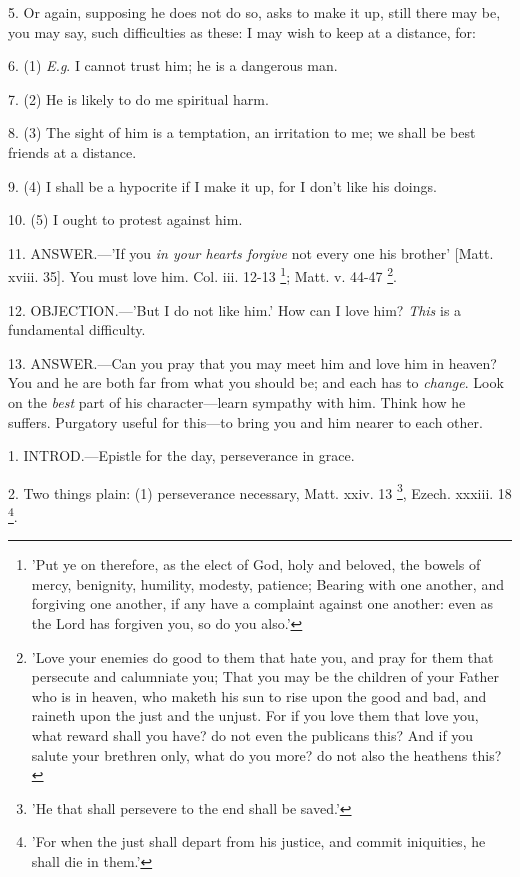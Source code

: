 5. Or again, supposing he does not do so, asks to
make it up, still there may be, you may say, such difficulties as
these: I may wish to keep at a distance, for:

6. (1) \emph{E.g}. I cannot trust him; he is a
dangerous man.

7. (2) He is likely to do me spiritual harm.

8. (3) The sight of him is a temptation, an
irritation to me; we shall be best friends at a distance.

9. (4) I shall be a hypocrite if I make it up,
for I don't like his doings.

10. (5) I ought to protest against him.

11. ANSWER.—'If
you \emph{in your hearts forgive} not every one his brother'
[Matt. xviii. 35]. You must love him. Col. iii. 12-13 \footnote{'Put ye on therefore, as
the elect of God, holy and beloved, the bowels of mercy, benignity,
humility, modesty, patience; Bearing with one another, and forgiving
one another, if any have a complaint against one another: even as the
Lord has forgiven you, so do you also.'}; Matt. v. 44-47 \footnote{'Love your enemies do
good to them that hate you, and pray for them that persecute and
calumniate you; That you may be the children of your Father who is in
heaven, who maketh his sun to rise upon the good and bad, and raineth
upon the just and the unjust. For if you love them that love you, what
reward shall you have? do not even the publicans this? And if you
salute your brethren only, what do you more? do not also the heathens
this?}.

12. OBJECTION.—'But
I do not like him.' How can I love him? \emph{This} is a fundamental
difficulty.

13. ANSWER.—Can
you pray that you may meet him and love him in heaven? You and he are
both far from what you should be; and each has to \emph{change}. Look
on the \emph{best} part of his character—learn sympathy with him.
Think how he suffers. Purgatory useful for this—to bring you and him
nearer to each other.


1. INTROD.—Epistle
for the day, perseverance in grace.

2. Two things plain: (1) perseverance necessary,
Matt. xxiv. 13 \footnote{'He that shall persevere
to the end shall be saved.'}, Ezech.
xxxiii. 18 \footnote{'For when the just shall
depart from his justice, and commit iniquities, he shall die in them.'}.


